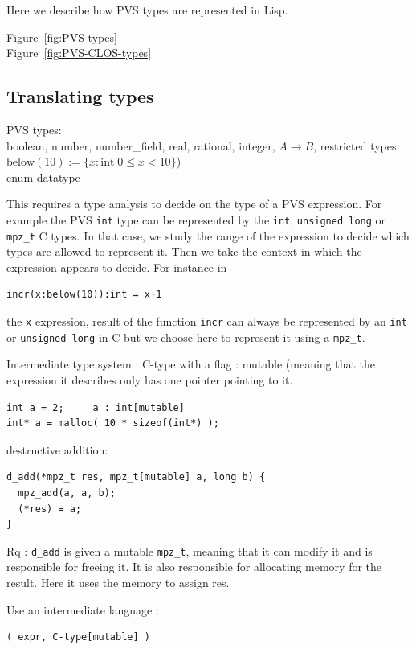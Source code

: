 \documentclass[12pt,a4paper,titlepage]{article}
\newcommand{\cl}[1]{\texttt{#1}}
\newcommand{\mpzt}{\texttt{mpz\_t}}
\begin{document}
Here we describe how PVS types are represented in 
Lisp.

Figure~\ref{fig:PVS-types} \\
Figure~\ref{fig:PVS-CLOS-types}


\subsection{Translating types}
PVS types:\\
boolean, number, number\_field, real, 
rational, integer, $A \rightarrow B$, restricted types
$\text{below}(10) := \{ x:\text{int} | 0 \leq x < 10 \} $)  \\
enum
datatype


This requires a type analysis to decide on the type of a PVS expression. For example the PVS \cl{int} type can be represented by the \cl{int}, \cl{unsigned long} or \cl{mpz\_t} C types. In that case, we study the range of the expression to decide which types are allowed to represent it. Then we take the context in which the expression appears to decide. For instance in
\begin{lstlisting}
incr(x:below(10)):int = x+1
\end{lstlisting}
the \cl{x} expression, result of the function \cl{incr} can always be represented by an \cl{int} or \cl{unsigned long} in C but we choose here to represent it using a \cl{mpz\_t}.

Intermediate type system :
C-type with a flag : mutable (meaning that the expression it describes only has one pointer pointing to it.

\begin{lstlisting}
int a = 2;     a : int[mutable]
int* a = malloc( 10 * sizeof(int*) );  
\end{lstlisting}

destructive addition:

\begin{lstlisting}
d_add(*mpz_t res, mpz_t[mutable] a, long b) {
  mpz_add(a, a, b);
  (*res) = a;
}
\end{lstlisting}

Rq : \cl{d\_add} is given a mutable \mpzt, meaning that it can modify it and is responsible for freeing it.
It is also responsible for allocating memory for the result.
Here it uses the memory to assign res.



Use an intermediate language :

\begin{lstlisting}
( expr, C-type[mutable] )
\end{lstlisting}
\end{document}
